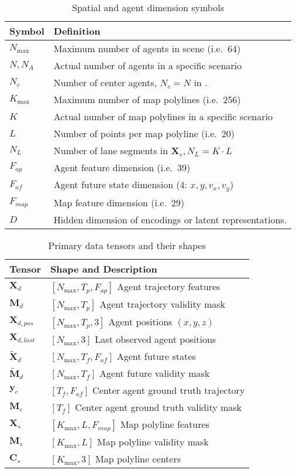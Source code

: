 \begin{table}[H]
\caption{Spatial and agent dimension symbols}
\label{tab:shape_symbols}
\centering
\begin{tabular}{p{3cm}p{10cm}}
\toprule
\textbf{Symbol} & \textbf{Definition} \\
\midrule
\(N_{\max}\) & Maximum number of agents in scene (i.e.\ 64) \\
\(N, N_A\) & Actual number of agents in a specific scenario \\
\(N_c\) & Number of center agents, \(N_c = N \) in \cite{lmformerYadav2025}. \\
\(K_{\max}\) & Maximum number of map polylines (i.e.\ 256) \\
\(K\) & Actual number of map polylines in a specific scenario \\
\(L\) & Number of points per map polyline (i.e.\ 20) \\
\( N_L\) & Number of lane segments in \( \boldsymbol{X}_s, N_L=K \cdot L \) \\
\(F_{ap}\) & Agent feature dimension (i.e.\ 39) \\
\(F_{af}\) & Agent future state dimension (4: \(x, y, v_x, v_y\)) \\
\(F_{map}\) & Map feature dimension (i.e.\ 29) \\
\(D\) & Hidden dimension of encodings or latent representations. \\
\bottomrule
\end{tabular}
\end{table}

\begin{table}[H]
\caption{Primary data tensors and their shapes}
\label{tab:data_tensors}
\centering
\begin{tabular}{p{4cm}p{9cm}}
\toprule
\textbf{Tensor} & \textbf{Shape and Description} \\
\midrule
\(\boldsymbol{X}_d\) & \([N_{\max}, T_p, F_{ap}]\) Agent trajectory features \\
\(\boldsymbol{M}_d\) & \([N_{\max}, T_p]\) Agent trajectory validity mask \\
\(\boldsymbol{X}_{d,pos}\) & \([N_{\max}, T_p, 3]\) Agent positions \((x, y, z)\) \\
\(\boldsymbol{X}_{d,last}\) & \([N_{\max}, 3]\) Last observed agent positions \\
\(\tilde{\boldsymbol{X}}_d\) & \([N_{\max}, T_f, F_{af}]\) Agent future states \\
\(\tilde{\boldsymbol{M}}_d\) & \([N_{\max}, T_f]\) Agent future validity mask \\
\(\boldsymbol{y}_c\) & \([T_f, F_{af}]\) Center agent ground truth trajectory \\
\(\boldsymbol{M}_c\) & \([T_f]\) Center agent ground truth validity mask \\
\(\boldsymbol{X}_s\) & \([K_{\max}, L, F_{map}]\) Map polyline features \\
\(\boldsymbol{M}_s\) & \([K_{\max}, L]\) Map polyline validity mask \\
\(\boldsymbol{C}_s\) & \([K_{\max}, 3]\) Map polyline centers \\
\bottomrule
\end{tabular}
\end{table}

